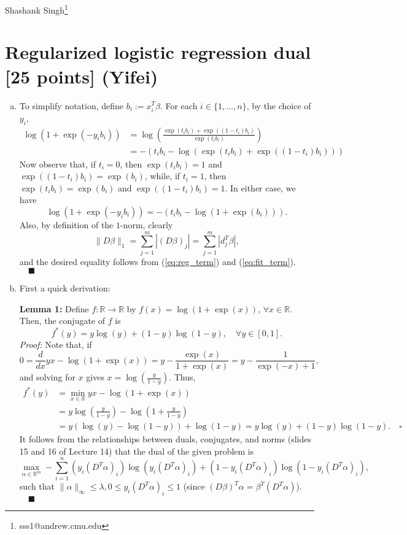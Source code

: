 \documentclass[11pt]{article}
\newcommand{\R}{\mathbb{R}}
\renewcommand{\qed}{\ensuremath{\quad \blacksquare}}
\begin{document}
Shashank Singh\footnote{sss1@andrew.cmu.edu}
\setcounter{section}{3}
\section{Regularized logistic regression dual [25 points] (Yifei)}
\begin{enumerate}[(a)]
\item To simplify notation, define $b_i := x_i^T\beta$. For each
$i \in \{1,\dots,n\}$, by the choice of $y_i$,
\begin{align*}
\log\left( 1 + \exp(-y_ib_i) \right)
 &  = \log\left(\frac{\exp(t_ib_i) + \exp((1 - t_i)b_i)}{\exp(t_ib_i)}\right)\\
 &  = -\left(t_ib_i - \log\left(\exp(t_ib_i) + \exp((1 - t_i)b_i)\right)\right)
\end{align*}
Now observe that, if $t_i = 0$, then $\exp(t_ib_i) = 1$ and
$\exp((1 - t_i) b_i) = \exp(b_i)$, while, if $t_i = 1$, then
$\exp(t_ib_i) = \exp(b_i)$ and $\exp((1 - t_i)b_i) = 1$. In either case, we
have
\begin{equation}
\label{eq:fit_term}
\log\left( 1 + \exp(-y_ib_i) \right)
    = -\left( t_ib_i - \log\left( 1 + \exp(b_i) \right) \right).
\end{equation}
Also, by definition of the $1$-norm, clearly
\begin{equation}
\label{eq:reg_term}
\|D\beta\|_1 = \sum_{j = 1}^m |(D\beta)_j| = \sum_{j = 1}^m |d_j^T\beta|,
\end{equation}
and the desired equality follows from (\ref{eq:reg_term}) and
(\ref{eq:fit_term}). \qed

\item First a quick derivation:

{\bf Lemma 1:} Define $f : \R \to \R$ by $f(x) = \log(1 + \exp(x))$,
$\forall x \in \R$. Then, the conjugate of $f$ is
\[f^*(y) = y\log(y) + (1 - y)\log(1 - y), \quad \forall y \in [0,1].\]
\emph{Proof:} Note that, if
\[0
    = \frac{d}{dx} yx - \log(1 + \exp(x))
    = y - \frac{\exp(x)}{1 + \exp(x)}
    = y - \frac{1}{\exp(-x) + 1},
\]
and solving for $x$ gives $x = \log \left( \frac{y}{1 - y} \right)$. Thus,
\begin{align*}
f^*(y)
 &  = \min_{x \in \R} yx - \log(1 + \exp(x))    \\
 &  = y\log\left( \frac{y}{1 - y} \right) - \log\left(1 + \frac{y}{1 - y}\right)    \\
 &  = y\left(\log(y) - \log(1 - y)\right) + \log(1 - y)
    = y\log(y) + (1 - y)\log(1 - y). \quad \square
\end{align*}
It follows from the relationships between duals, conjugates, and norms (slides
15 and 16 of Lecture 14) that the dual of the given problem is
\[\max_{\alpha\in\R^m} -\sum_{i = 1}^n
    (y_i(D^T\alpha)_i)\log(y_i(D^T\alpha)_i)
    + (1 - y_i(D^T\alpha)_i)\log(1 - y_i(D^T\alpha)_i),\]
such that $\|\alpha\|_\infty \leq \lambda,0 \leq y_i(D^T\alpha)_i \leq 1$
(since $(D\beta)^T\alpha = \beta^T(D^T\alpha)$). \qed


\end{enumerate}
\end{document}
